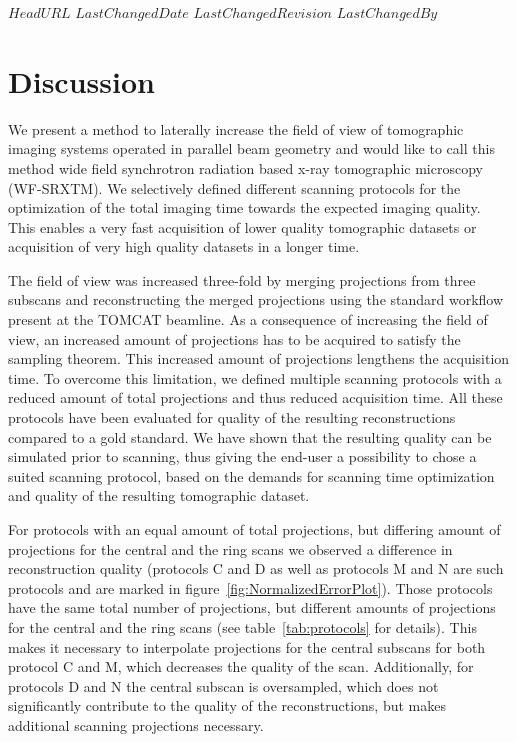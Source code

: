 \svnidlong
{$HeadURL$}
{$LastChangedDate$}
{$LastChangedRevision$}
{$LastChangedBy$}
%
%
\section{Discussion}\label{sec:Discussion}%

We present a method to laterally increase the field of view of tomographic imaging systems operated in parallel beam geometry and would like to call this method wide field synchrotron radiation based x-ray tomographic microscopy (WF-SRXTM). We selectively defined different scanning protocols for the optimization of the total imaging time towards the expected imaging quality. This enables a very fast acquisition of lower quality tomographic datasets or acquisition of very high quality datasets in a longer time.

The field of view was increased three-fold by merging projections from three subscans and reconstructing the merged projections using the standard workflow present at the TOMCAT beamline. As a consequence of increasing the field of view, an increased amount of projections has to be acquired to satisfy the sampling theorem. This increased amount of projections lengthens the acquisition time. To overcome this limitation, we defined multiple scanning protocols with a reduced amount of total projections and thus reduced acquisition time. All these protocols have been evaluated for quality of the resulting reconstructions compared to a gold standard. We have shown that the resulting quality can be simulated prior to scanning, thus giving the end-user a possibility to chose a suited scanning protocol, based on the demands for scanning time optimization and quality of the resulting tomographic dataset.

For protocols with an equal amount of total projections, but differing amount of projections for the central and the ring scans we observed a difference in reconstruction quality (protocols C and D as well as protocols M and N are such protocols and are marked in figure~\ref{fig:NormalizedErrorPlot}). Those protocols have the same total number of projections, but different amounts of projections for the central and the ring scans (see table~\ref{tab:protocols} for details). This makes it necessary to interpolate projections for the central subscans for both protocol C and M, which decreases the quality of the scan. Additionally, for protocols D and N the central subscan is oversampled, which does not significantly contribute to the quality of the reconstructions, but makes additional scanning projections necessary. 

